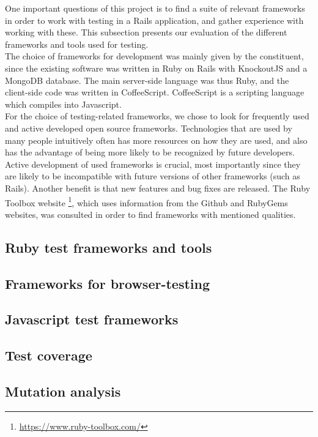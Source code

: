 \MakeShortVerb{\|}
\label{sec:choices}

One important questions of this project is to find a suite of relevant
frameworks in order to work with testing in a Rails application, and
gather experience with working with these. This subsection presents our
evaluation of the different frameworks and tools used for testing.\\

The choice of frameworks for development was mainly given by the
constituent, since the existing software was written in Ruby on Rails
with KnockoutJS and a MongoDB database. The main server-side language
was thus Ruby, and the client-side code was written in CoffeeScript.
CoffeeScript is a scripting language which compiles into Javascript.\\

For the choice of testing-related frameworks, we chose to look for
frequently used and active developed open source frameworks.
Technologies that are used by many people intuitively often has more
resources on how they are used, and also has the advantage of being more
likely to be recognized by future developers. Active development of used
frameworks is crucial, most importantly since they are likely to be
incompatible with future versions of other frameworks (such as Rails).
Another benefit is that new features and bug fixes are released. The
Ruby Toolbox website \footnote{\url{https://www.ruby-toolbox.com/}},
which uses information from the Github and RubyGems websites, was
consulted in order to find frameworks with mentioned qualities.\\

\subsection{Ruby test frameworks and tools}


\subsection{Frameworks for browser-testing}


\subsection{Javascript test frameworks}


\subsection{Test coverage}


\subsection{Mutation analysis}

